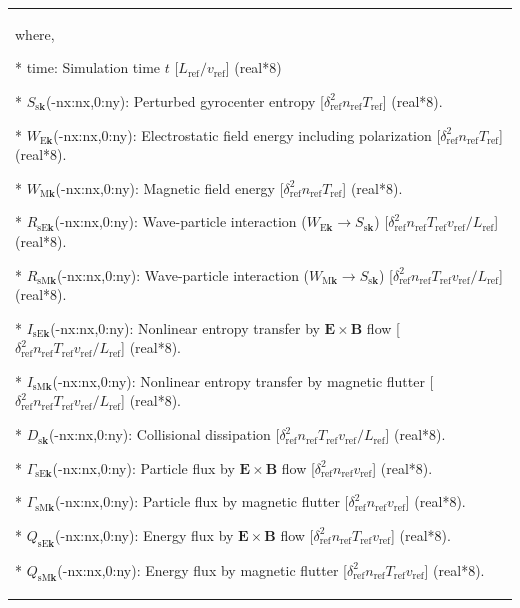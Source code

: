 \begin{longtable}{ p{15cm} }
\begin{itemize}
            where,

            * time: Simulation time $t$ [$L_\mathrm{ref}/v_\mathrm{ref}$] (real*8)

            * $S_{\mathrm{s}\bm{k}}$(-nx:nx,0:ny): Perturbed gyrocenter entropy [$\delta_\mathrm{ref}^2n_\mathrm{ref}T_\mathrm{ref}$] (real*8).
 
            * $W_{\mathrm{E}\bm{k}}$(-nx:nx,0:ny): Electrostatic field energy including polarization [$\delta_\mathrm{ref}^2n_\mathrm{ref}T_\mathrm{ref}$] (real*8).
 
            * $W_{\mathrm{M}\bm{k}}$(-nx:nx,0:ny): Magnetic field energy [$\delta_\mathrm{ref}^2n_\mathrm{ref}T_\mathrm{ref}$] (real*8).
 
            * $R_{\mathrm{sE}\bm{k}}$(-nx:nx,0:ny): Wave-particle interaction ($W_{\mathrm{E}\bm{k}} \rightarrow S_{\mathrm{s}\bm{k}}$) [$\delta_\mathrm{ref}^2n_\mathrm{ref}T_\mathrm{ref}v_\mathrm{ref}/L_\mathrm{ref}$] (real*8).
 
            * $R_{\mathrm{sM}\bm{k}}$(-nx:nx,0:ny): Wave-particle interaction ($W_{\mathrm{M}\bm{k}} \rightarrow S_{\mathrm{s}\bm{k}}$) [$\delta_\mathrm{ref}^2n_\mathrm{ref}T_\mathrm{ref}v_\mathrm{ref}/L_\mathrm{ref}$] (real*8).
 
            * $I_{\mathrm{sE}\bm{k}}$(-nx:nx,0:ny): Nonlinear entropy transfer by $\bm{E}\times\bm{B}$ flow [$\delta_\mathrm{ref}^2n_\mathrm{ref}T_\mathrm{ref}v_\mathrm{ref}/L_\mathrm{ref}$] (real*8).
 
            * $I_{\mathrm{sM}\bm{k}}$(-nx:nx,0:ny): Nonlinear entropy transfer by magnetic flutter [$\delta_\mathrm{ref}^2n_\mathrm{ref}T_\mathrm{ref}v_\mathrm{ref}/L_\mathrm{ref}$] (real*8).
 
            * $D_{\mathrm{s}\bm{k}}$(-nx:nx,0:ny): Collisional dissipation [$\delta_\mathrm{ref}^2n_\mathrm{ref}T_\mathrm{ref}v_\mathrm{ref}/L_\mathrm{ref}$] (real*8).
 
            * $\Gamma_{\mathrm{sE}\bm{k}}$(-nx:nx,0:ny): Particle flux by $\bm{E}\times\bm{B}$ flow [$\delta_\mathrm{ref}^2n_\mathrm{ref}v_\mathrm{ref}$] (real*8).

            * $\Gamma_{\mathrm{sM}\bm{k}}$(-nx:nx,0:ny): Particle flux by magnetic flutter [$\delta_\mathrm{ref}^2n_\mathrm{ref}v_\mathrm{ref}$] (real*8).

            * $Q_{\mathrm{sE}\bm{k}}$(-nx:nx,0:ny): Energy flux by $\bm{E}\times\bm{B}$ flow [$\delta_\mathrm{ref}^2n_\mathrm{ref}T_\mathrm{ref}v_\mathrm{ref}$] (real*8).
 
            * $Q_{\mathrm{sM}\bm{k}}$(-nx:nx,0:ny): Energy flux by magnetic flutter [$\delta_\mathrm{ref}^2n_\mathrm{ref}T_\mathrm{ref}v_\mathrm{ref}$] (real*8).


\end{itemize}
\end{longtable}
